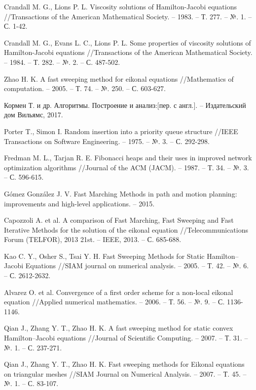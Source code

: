\begin{thebibliography}{99}
 Crandall M. G., Lions P. L. Viscosity solutions of
  Hamilton-Jacobi equations //Transactions of the American
  Mathematical Society. – 1983. – Т. 277. – №. 1. – С. 1-42.

 Crandall M. G., Evans L. C., Lions P. L. Some
  properties of viscosity solutions of Hamilton-Jacobi equations
  //Transactions of the American Mathematical Society. – 1984. –
  Т. 282. – №. 2. – С. 487-502.

  
 Zhao H. K. A fast sweeping method for eikonal
  equations //Mathematics of computation. – 2005. – Т. 74. – №. 250. –
  С. 603-627.

 Кормен Т. и др. Алгоритмы. Построение и анализ:[пер. с
  англ.]. – Издательский дом Вильямс, 2017.

 Porter T., Simon I. Random insertion into a priority
  queue structure //IEEE Transactions on Software Engineering. –
  1975. – №. 3. – С. 292-298.


 Fredman M. L., Tarjan R. E. Fibonacci heaps and their
  uses in improved network optimization algorithms //Journal of the
  ACM (JACM). – 1987. – Т. 34. – №. 3. – С. 596-615.

  
Gómez González J. V. Fast Marching Methods in path and
  motion planning: improvements and high-level applications. – 2015.
  
Capozzoli A. et al. A comparison of Fast Marching, Fast
  Sweeping and Fast Iterative Methods for the solution of the eikonal
  equation //Telecommunications Forum (TELFOR), 2013 21st. – IEEE,
  2013. – С. 685-688.
  
 Kao C. Y., Osher S., Tsai Y. H. Fast Sweeping
  Methods for Static Hamilton--Jacobi Equations //SIAM journal on
  numerical analysis. – 2005. – Т. 42. – №. 6. – С. 2612-2632.

Alvarez O. et al. Convergence of a first order scheme
  for a non-local eikonal equation //Applied numerical mathematics. –
  2006. – Т. 56. – №. 9. – С. 1136-1146.
  
Qian J., Zhang Y. T., Zhao H. K. A fast sweeping
  method for static convex Hamilton–Jacobi equations //Journal of
  Scientific Computing. – 2007. – Т. 31. – №. 1. – С. 237-271.
  
 Qian J., Zhang Y. T., Zhao H. K. Fast sweeping
  methods for Eikonal equations on triangular meshes //SIAM Journal on
  Numerical Analysis. – 2007. – Т. 45. – №. 1. – С. 83-107.


\end{thebibliography}
